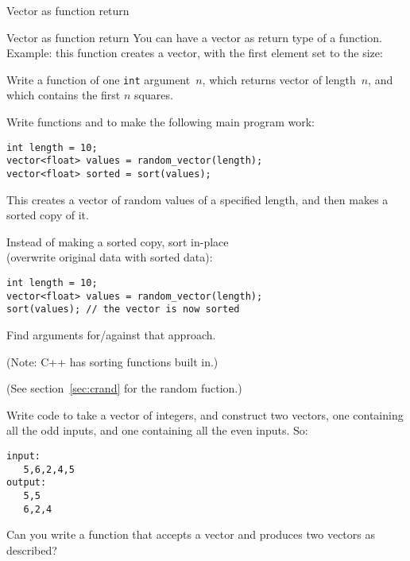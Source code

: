  {Vector as function return}

\begin{block}{Vector as function return}
  \label{sl:vector-return}
  You can have a vector as return type of a function.\\
  Example: this function
  creates a vector, with the first element set to the size:
\end{block}

\begin{exercise}
  \label{ex:vec-of-squares}
  Write a function of one \lstinline{int} argument~$n$, which returns vector
  of length~$n$, and which contains the first $n$ squares.
\end{exercise}

\begin{exercise}
  \label{ex:vec-rand-sort}
  Write functions  and  to make the following
  main program work:
\begin{lstlisting}
int length = 10;
vector<float> values = random_vector(length);
vector<float> sorted = sort(values);
\end{lstlisting}
  This creates a vector of random values of a specified length, and
  then makes a sorted copy of it.

  Instead of making a sorted copy, sort in-place\\
  (overwrite original data with sorted data):
\begin{lstlisting}
int length = 10;
vector<float> values = random_vector(length);
sort(values); // the vector is now sorted
\end{lstlisting}
  Find
  arguments for/against that approach.

  (Note: C++ has sorting functions built in.)
\end{exercise}

(See section~\ref{sec:crand} for the random fuction.)

\begin{exercise}
  \label{ex:splitoddeven}
  Write code to take a vector of integers, and construct two
  vectors, one containing all the odd inputs, and one containing all
  the even inputs. So:
\begin{lstlisting}
input:
   5,6,2,4,5
output:
   5,5
   6,2,4
\end{lstlisting}
  Can you write a function that accepts a vector and produces two
  vectors as described?
\end{exercise}


